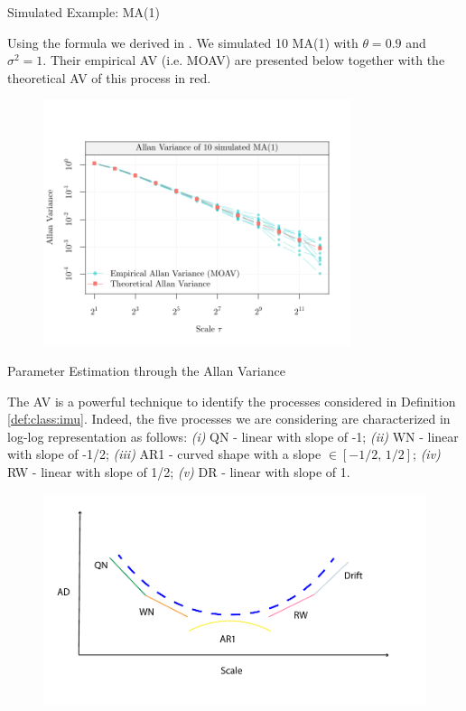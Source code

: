 \documentclass[envcountsect,usenames,dvipsnames]{beamer}
\theoremstyle{mystyle}
\begin{document}
\begin{frame}{Simulated Example: MA(1)}

Using the formula we derived in \hyperlink{theoAVMA1}{}. We simulated 10 MA(1) with $\theta = 0.9$ and $\sigma^2 = 1$. Their empirical AV (i.e. MOAV) are presented below together with the theoretical AV of this process in red.

\vspace{-1cm}
\begin{figure}
	    \centering
	  \includegraphics[width = 9cm]{Images/av_example.pdf}
	\end{figure}
	
\end{frame}


\begin{frame}{Parameter Estimation through the Allan Variance}
\footnotesize

The AV is a powerful technique to identify the processes considered in Definition \ref{def:class:imu}. Indeed, the five processes we are considering are characterized in log-log representation as follows: \textit{(i)} QN - linear with slope of -1; \textit{(ii)} WN - linear with slope of -1/2; \textit{(iii)} AR1 - curved shape with a slope $\in [-1/2, \, 1/2]$; \textit{(iv)} RW - linear with slope of 1/2;  \textit{(v)} DR - linear with slope of 1.

\vspace{-0.3cm}
    \begin{figure}
	    \centering
	  \includegraphics[width = 12cm]{Images/process_slope.pdf}
	\end{figure}
	
\end{frame}
\end{document}
